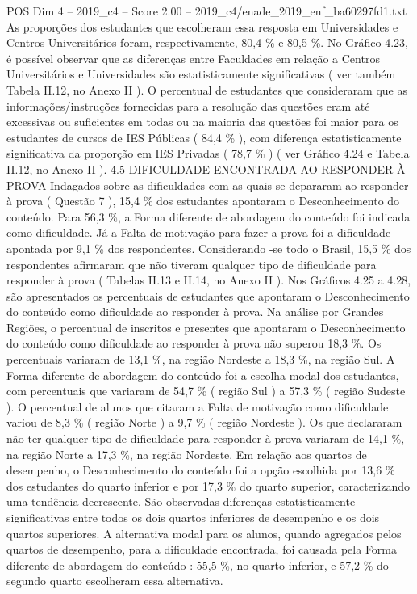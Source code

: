 \begin{textsample}{POS Dim 4 – 2019\_c4 – Score 2.00 – 2019\_c4/enade\_2019\_enf\_ba60297fd1.txt}
As proporções dos estudantes que escolheram essa resposta em Universidades e Centros Universitários foram, respectivamente, 80,4 \% e 80,5 \%.
No Gráfico 4.23, é possível observar que as diferenças entre Faculdades em relação a Centros Universitários e Universidades são estatisticamente significativas ( ver também Tabela II.12, no Anexo II ).
O percentual de estudantes que consideraram que as informações/instruções fornecidas para a resolução das questões eram até excessivas ou suficientes em todas ou na maioria das questões foi maior para os estudantes de cursos de IES Públicas ( 84,4 \% ), com diferença estatisticamente significativa da proporção em IES Privadas ( 78,7 \% ) ( ver Gráfico 4.24 e Tabela II.12, no Anexo II ). 4.5 DIFICULDADE ENCONTRADA AO RESPONDER À PROVA Indagados sobre as dificuldades com as quais se depararam ao responder à prova ( Questão 7 ), 15,4 \% dos estudantes apontaram o Desconhecimento do conteúdo.
Para 56,3 \%, a Forma diferente de abordagem do conteúdo foi indicada como dificuldade.
Já a Falta de motivação para fazer a prova foi a dificuldade apontada por 9,1 \% dos respondentes.
Considerando -se todo o Brasil, 15,5 \% dos respondentes afirmaram que não tiveram qualquer tipo de dificuldade para responder à prova ( Tabelas II.13 e II.14, no Anexo II ).
Nos Gráficos 4.25 a 4.28, são apresentados os percentuais de estudantes que apontaram o Desconhecimento do conteúdo como dificuldade ao responder à prova.
Na análise por Grandes Regiões, o percentual de inscritos e presentes que apontaram o Desconhecimento do conteúdo como dificuldade ao responder à prova não superou 18,3 \%.
Os percentuais variaram de 13,1 \%, na região Nordeste a 18,3 \%, na região Sul.
A Forma diferente de abordagem do conteúdo foi a escolha modal dos estudantes, com percentuais que variaram de 54,7 \% ( região Sul ) a 57,3 \% ( região Sudeste ).
O percentual de alunos que citaram a Falta de motivação como dificuldade variou de 8,3 \% ( região Norte ) a 9,7 \% ( região Nordeste ).
Os que declararam não ter qualquer tipo de dificuldade para responder à prova variaram de 14,1 \%, na região Norte a 17,3 \%, na região Nordeste.
Em relação aos quartos de desempenho, o Desconhecimento do conteúdo foi a opção escolhida por 13,6 \% dos estudantes do quarto inferior e por 17,3 \% do quarto superior, caracterizando uma tendência decrescente.
São observadas diferenças estatisticamente significativas entre todos os dois quartos inferiores de desempenho e os dois quartos superiores.
A alternativa modal para os alunos, quando agregados pelos quartos de desempenho, para a dificuldade encontrada, foi causada pela Forma diferente de abordagem do conteúdo : 55,5 \%, no quarto inferior, e 57,2 \% do segundo quarto escolheram essa alternativa.

\end{textsample}
